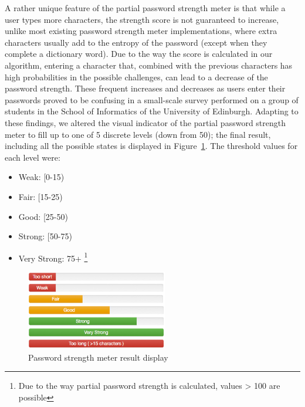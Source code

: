   A rather unique feature of the partial password strength meter is that while a user types more characters, the strength score is not guaranteed to increase, unlike most existing password strength meter implementations, where extra characters usually add to the entropy of the password (except when they complete a dictionary word). Due to the way the score is calculated in our algorithm, entering a character that, combined with the previous characters has high probabilities in the possible challenges, can lead to a decrease of the password strength. These frequent increases and decreases as users enter their passwords proved to be confusing in a small-scale survey performed on a group of students in the School of Informatics of the University of Edinburgh. Adapting to these findings, we altered the visual indicator of the partial password strength meter to fill up to one of 5 discrete levels (down from 50); the final result, including all the possible states is displayed in Figure~\ref{fig:str-meter}. The threshold values for each level were:
  \begin{itemize}
    \item Weak: [0-15)
    \item Fair: [15-25)
    \item Good: [25-50)
    \item Strong: [50-75)
    \item Very Strong: 75+ \footnote{Due to the way partial password strength is calculated, values > 100 are possible}
  \end{itemize}

  \begin{figure}[htpb]
    \centering
    \includegraphics[width=0.55\textwidth]{Images/ppass-str-meter}
    \caption{Password strength meter result display}
    \label{fig:str-meter}
  \end{figure}

